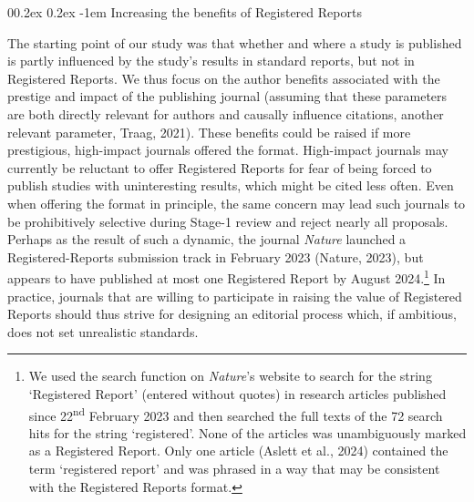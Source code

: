 \documentclass[
  ,man,mask,floatsintext]{apa6}
\makeatletter
\let\oldparagraph\paragraph
\renewcommand{\paragraph}[1]{\oldparagraph{#1}\mbox{}}
\renewcommand{\paragraph}{\@startsection{paragraph}{4}{\parindent}%
  {0\baselineskip \@plus 0.2ex \@minus 0.2ex}%
  {-1em}%
  {\normalfont\normalsize\bfseries\itshape\typesectitle}}
\makeatother
\begin{document}
\par\vspace{0.4\baselineskip}

\hypertarget{increasing-the-benefits-of-registered-reports}{%
\paragraph{Increasing the benefits of Registered Reports}\label{increasing-the-benefits-of-registered-reports}}

The starting point of our study was that
whether and where a study is published is partly influenced by the study's results in standard reports, but not in Registered Reports.
We thus focus on the author benefits associated with the prestige and impact of the publishing journal (assuming that these parameters are both directly relevant for authors and causally influence citations, another relevant parameter, Traag, 2021).
These benefits could be raised if more prestigious, high-impact journals offered the format.
High-impact journals may currently be reluctant to offer
Registered Reports for fear of being forced to publish studies with uninteresting results, which might be cited less often.
Even when offering the format in principle, the same concern may lead such journals to be prohibitively selective during Stage-1 review and reject nearly all proposals.
Perhaps as the result of such a dynamic, the journal \emph{Nature} launched a Registered-Reports submission track in February 2023 (Nature, 2023), but appears to have published at most one Registered Report by August 2024.\footnote{We used the search function on \emph{Nature}'s website to search for the string `Registered Report' (entered without quotes) in research articles published since 22\textsuperscript{nd} February 2023 and then searched the full texts of the 72 search hits for the string `registered'. None of the articles was unambiguously marked as a Registered Report. Only one article (Aslett et al., 2024) contained the term `registered report' and was phrased in a way that may be consistent with the Registered Reports format.}
In practice, journals that are willing to participate in raising the value of Registered Reports should thus strive for designing an editorial process which, if ambitious, does not set unrealistic standards.
\end{document}
